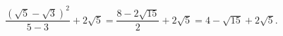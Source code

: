 $\dfrac{\left(\sqrt5-\sqrt3\right)^2}{5-3}+2\sqrt5=\dfrac{8-2\sqrt{15}}{2}+2\sqrt5=\boxed{4-\sqrt{15}+2\sqrt5}$.
